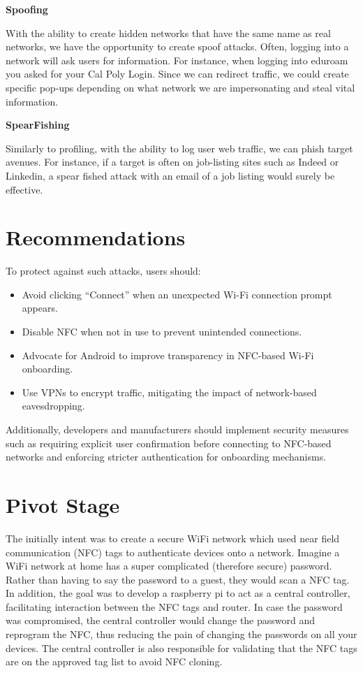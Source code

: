 \documentclass[sigconf]{acmart}
\begin{document}
\textbf{Spoofing}

With the ability to create hidden networks that have the same name as real networks, we have the opportunity to create spoof attacks. Often, logging into a network will ask users for information. For instance, when logging into eduroam you asked for your Cal Poly Login. Since we can redirect traffic, we could create specific pop-ups depending on what network we are impersonating and steal vital information.

\textbf{SpearFishing} 

Similarly to profiling, with the ability to log user web traffic, we can phish target avenues. For instance, if a target is often on job-listing sites such as Indeed or Linkedin, a spear fished attack with an email of a job listing would surely be effective. 



\section{Recommendations}
To protect against such attacks, users should:
\begin{itemize}
    \item Avoid clicking “Connect” when an unexpected Wi-Fi connection prompt appears.
    \item Disable NFC when not in use to prevent unintended connections.
    \item Advocate for Android to improve transparency in NFC-based Wi-Fi onboarding.
    \item Use VPNs to encrypt traffic, mitigating the impact of network-based eavesdropping.
\end{itemize}

Additionally, developers and manufacturers should implement security measures such as requiring explicit user confirmation before connecting to NFC-based networks and enforcing stricter authentication for onboarding mechanisms.

\section{Pivot Stage}

The initially intent was to create a secure WiFi network which used near field communication (NFC) tags to authenticate devices onto a network. Imagine a WiFi network at home has a super complicated (therefore secure) password. Rather than having to say the password to a guest, they would scan a NFC tag. In addition, the goal was to develop a raspberry pi to act as a central controller, facilitating interaction between the NFC tags and router. In case the password was compromised, the central controller would change the password and reprogram the NFC, thus reducing the pain of changing the passwords on all your devices. The central controller is also responsible for validating that the NFC tags are on the approved tag list to avoid NFC cloning. \newline
\end{document}

